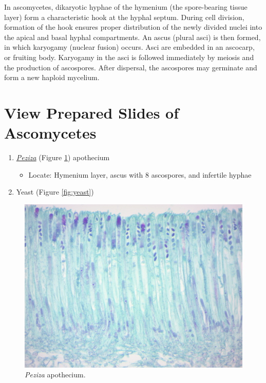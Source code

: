 In ascomycetes, dikaryotic hyphae of the hymenium (the spore-bearing
tissue layer) form a characteristic hook at the hyphal septum. During
cell division, formation of the hook ensures proper distribution of the
newly divided nuclei into the apical and basal hyphal compartments. An
ascus (plural asci) is then formed, in which karyogamy (nuclear fusion)
occurs. Asci are embedded in an ascocarp, or fruiting body. Karyogamy in
the asci is followed immediately by meiosis and the production of
ascospores. After dispersal, the ascospores may germinate and form a new
haploid mycelium.

\section{View Prepared Slides of
Ascomycetes}\label{view-the-prepared-slides-ascomycetes}

\begin{enumerate}
\def\labelenumi{\arabic{enumi}.}
\tightlist
\item
  \href{https://en.wikipedia.org/wiki/Peziza}{\emph{Peziza}}
  (Figure \ref{fig:peziza}) apothecium

  \begin{itemize}
  \tightlist
  \item
    Locate: Hymenium layer, ascus with 8 ascospores, and infertile
    hyphae
  \end{itemize}
\item
  Yeast (Figure \ref{fig:yeast})
\end{enumerate}



\begin{figure}

{\centering \includegraphics[width=0.7\linewidth]{./figures/fungi/peziza_apothecium}

}

\caption{\emph{Peziza} apothecium.}\label{fig:peziza}
\end{figure}

